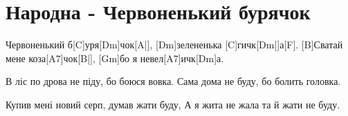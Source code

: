 \section{Народна - Червоненький бурячок}
\begin{guitar}
[Dm]Червоненький б[C]уря[Dm]чок[A|], [Dm]зелененька [C]гичк[Dm|]а[F].
[B]Сватай мене коза[A7]чок[B|], [Gm]бо я невел[A7]ичк[Dm]а.

В ліс по дрова не піду, бо боюся вовка.
Сама дома не буду, бо болить головка.

Купив мені новий серп, думав жати буду,
А я жита не жала та й жати не буду.
\end{guitar}